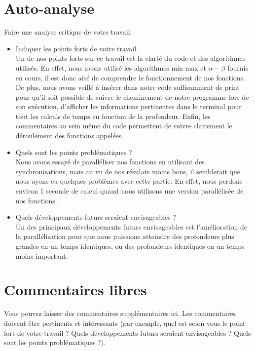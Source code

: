 \documentclass[a4paper, 11pt]{article}
\begin{document}
\section{Auto-analyse}

Faire une analyse critique de votre travail:\\
\begin{itemize}
\item Indiquer les points forts de votre travail. \\
  Un de nos points forts sur ce travail est la clarté du code et des algorithmes utilisés. En effet, nous avons utilisé les algorithmes min-max et $\alpha-\beta$ fournis en cours, il est donc aisé de comprendre le fonctionnement de nos fonctions. De plus, nous avons veillé à insérer dans notre code suffisamment de print pour qu'il soit possible de suivre le cheminement de notre programme lors de son exécution, d'afficher les informations pertinentes dans le terminal pour tout les calculs de temps en fonction de la profondeur. Enfin, les commentaires au sein même du code permettent de suivre clairement le déroulement des fonctions appelées.
\vspace{1cm}
\item Quels sont les points problématiques ? \\
  Nous avons essayé de paralléliser nos fonctions en utilisant des synchronisations, mais au vu de nos résulats moins bons, il semblerait que nous ayons eu quelques problèmes avec cette partie. En effet, nous perdons environ 1 seconde de calcul quand nous utilisons une version parallélisée de nos fonctions.  
\vspace{1cm}
\item Quels développements futurs seraient envisageables ? \\
  Un des principaux développements futurs envisageables est l'amélioration de la parallélisation pour que nous puissions atteindre des profondeurs plus grandes en un temps identiques, ou des profondeurs identiques en un temps moins important.
\vspace{1cm}
\end{itemize}


\section{Commentaires libres}

Vous pouvez laisser des commentaires supplémentaires ici. Les commentaires
doivent être pertinents et intéressants (par exemple, quel est selon vous
le point fort de votre travail ? Quels développements futurs seraient
envisageables ? Quels sont les points problématiques ?).
\end{document}
